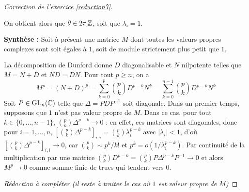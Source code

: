 \begin{proof}[Correction de l'exercice \ref{reduction7}]
\begin{itemize}
        On obtient alors que $\theta\in 2\pi\operatorname{\mathbb Z}$, soit que $\lambda_i=1$.
    \end{itemize}

    \textbf{Synthèse :} Soit à présent une matrice $M$ dont toutes les valeurs propres complexes sont soit égales à $1$,
    soit de module strictement plus petit que $1$.

    La décomposition de Dunford donne $D$ diagonalisable et $N$ nilpotente telles que $M=N+D$ et $ND=DN$.
    Pour tout $p\geq n$, on a 
    \[
        M^p=(N+D)^p=\sum_{k=0}^p\binom pkD^{p-k}N^k=\sum_{k=0}^{n-1}\binom pk D^{p-k}N^k   \tag*{(*)} 
    \]
    Soit $P\in\operatorname{GL}_n(\operatorname{\mathbb C})$ telle que $\Delta=PDP^{-1}$ soit diagonale. 
    Dans un premier temps, supposons que $1$ n'est pas valeur propre de $M$.
    Dans ce cas, pour tout $k\in\lbrace0,\dots,n-1\rbrace$, $\binom pk\Delta^{p-k}\to 0$ : en effet,
    ces matrices sont diagonales, donc pour $i=1,\dots,n$, $\left[\binom pk\Delta^{p-k}\right]_{i,i}=\binom pk\lambda_i^{p-k}$ avec 
    $|\lambda_i|<1$, d'où $\left[\binom pk\Delta^{p-k}\right]_{i,i}\to 0$, car $\binom pk\sim p^k/k!$ et $p^k=o(1/\lambda_i^{p-k})$.
    Par continuité de la multiplication par une matrice $\binom pk D^{p-k}=\binom pkP\Delta^{p-k}P^{-1}\to 0$ et alors $M^p\to 0$ comme somme finie de trucs qui tendent vers $0$.

	\textit{Rédaction à compléter (il reste à traiter le cas où $1$ est valeur propre de $M$)}
    
	
	
\end{proof}

